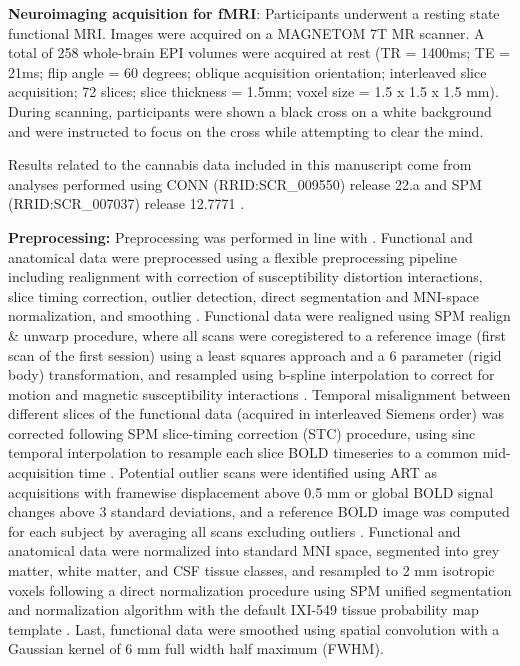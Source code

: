 \textbf{Neuroimaging acquisition for fMRI}: Participants underwent a
resting state functional MRI. Images were acquired on a MAGNETOM 7T MR
scanner. A total of 258 whole-brain EPI volumes were acquired at rest
(TR = 1400ms; TE = 21ms; flip angle = 60 degrees; oblique acquisition
orientation; interleaved slice acquisition; 72 slices; slice thickness =
1.5mm; voxel size = 1.5 x 1.5 x 1.5 mm). During scanning, participants
were shown a black cross on a white background and were instructed to
focus on the cross while attempting to clear the mind.

Results related to the cannabis data included in this manuscript come
from analyses performed using CONN (RRID:SCR\_009550) release 22.a and
SPM (RRID:SCR\_007037) release 12.7771 \parencite{Nieto-Castanon2022,Penny2007,Whitfield-Gabrieli2012}.

\textbf{Preprocessing:} Preprocessing was performed in line with \textcite{Luppi2021}. Functional and anatomical data were
preprocessed using a flexible preprocessing pipeline including
realignment with correction of susceptibility distortion interactions,
slice timing correction, outlier detection, direct segmentation and
MNI-space normalization, and smoothing \parencite{Nieto-Castanon2020}.
Functional data were realigned using SPM realign \& unwarp procedure,
where all scans were coregistered to a reference image (first scan of
the first session) using a least squares approach and a 6 parameter
(rigid body) transformation, and resampled using b-spline interpolation
to correct for motion and magnetic susceptibility interactions \parencite{Andersson2001,Friston1995}. Temporal
misalignment between different slices of the functional data (acquired
in interleaved Siemens order) was corrected following SPM slice-timing
correction (STC) procedure, using sinc temporal interpolation to
resample each slice BOLD timeseries to a common mid-acquisition time \parencite{Henson1999,Sladky2011}. Potential outlier scans were
identified using ART as acquisitions with framewise displacement above
0.5 mm or global BOLD signal changes above 3 standard deviations, and a
reference BOLD image was computed for each subject by averaging all
scans excluding outliers \parencite{Nieto-Castanon2022a,Power2014,Whitfield-Gabrieli2011}. Functional and
anatomical data were normalized into standard MNI space, segmented into
grey matter, white matter, and CSF tissue classes, and resampled to 2 mm
isotropic voxels following a direct normalization procedure using SPM
unified segmentation and normalization algorithm with the default
IXI-549 tissue probability map template \parencite{Ashburner2007,Ashburner2005,Calhoun2017,Nieto-Castanon2022a}. Last, functional data were smoothed using
spatial convolution with a Gaussian kernel of 6 mm full width half
maximum (FWHM).

